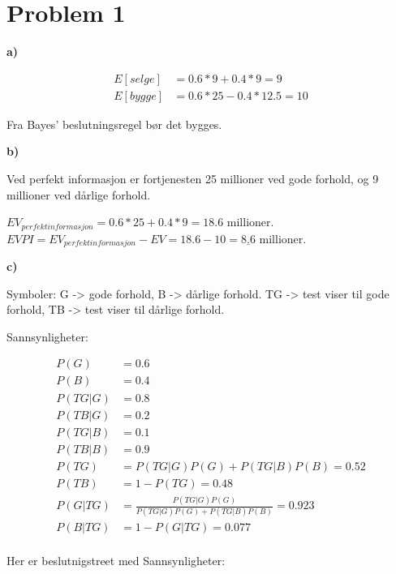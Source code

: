 \documentclass{article}
\begin{document}


\section*{\textbf{Problem 1}}
\vspace*{12pt}\small\textbf{a)}

\begin{align*}
  E[selge] &= 0.6 * 9 + 0.4 * 9 = 9 \\
  E[bygge] &= 0.6 * 25 - 0.4 * 12.5 = 10
\end{align*}

Fra Bayes' beslutningsregel bør det bygges.

\vspace*{12pt}\small\textbf{b)}

Ved perfekt informasjon er fortjenesten 25 millioner ved gode forhold, og 9 millioner ved dårlige forhold. 

$EV_{perfekt informasjon} = 0.6 * 25 + 0.4 * 9 = 18.6$ millioner. $EVPI = EV_{perfekt informasjon} - EV = 18.6 - 10 = \underline{8.6}$ millioner. 

\vspace*{12pt}\small\textbf{c)}

Symboler: G -> gode forhold, B -> dårlige forhold. TG -> test viser til gode forhold, TB -> test viser til dårlige forhold.

Sannsynligheter:

\begin{align*}
  P(G) &= 0.6 \\
  P(B) &= 0.4 \\
  P(TG|G) &= 0.8 \\
  P(TB|G) &= 0.2 \\
  P(TG|B) &= 0.1 \\
  P(TB|B) &= 0.9 \\
  P(TG) &= P(TG|G)P(G) + P(TG|B)P(B) = 0.52 \\
  P(TB) &= 1 - P(TG) = 0.48 \\ 
  P(G|TG) &= \frac{P(TG|G)P(G)}{P(TG|G)P(G) + P(TG|B)P(B)} = 0.923 \\
  P(B|TG) &= 1 - P(G|TG) = 0.077 \\
\end{align*}

\pagebreak Her er beslutnigstreet med Sannsynligheter: 
\end{document}
